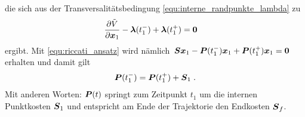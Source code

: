 die sich aus der Transversalitätsbedingung \eqref{equ:interne_randpunkte_lambda} zu
\begin{align*}
\frac{\partial \tilde  V}{\partial\boldsymbol{x}_1}-\boldsymbol{\lambda}(t_1^-) + \boldsymbol{\lambda}(t_1^+) &= \boldsymbol{0}
\end{align*}
ergibt.
Mit \eqref{equ:riccati_ansatz} wird nämlich $\,\boldsymbol{S} \boldsymbol{x}_1 - \boldsymbol{P}(t_1^-) \boldsymbol{x}_1 + \boldsymbol{P}(t_1^+) \boldsymbol{x}_1 = \boldsymbol{0}$ erhalten und damit gilt
\begin{align*} 
\bs P(t_1^-)= \bs P(t_1^+) + \bs S_1 \;. %
\end{align*}
Mit anderen Worten:  $\boldsymbol{P}(t)$ springt zum Zeitpunkt $t_1$ um die internen Punktkosten $\boldsymbol{S}_1$ und entspricht am Ende der Trajektorie den Endkosten $\boldsymbol{S}_f$.
%
